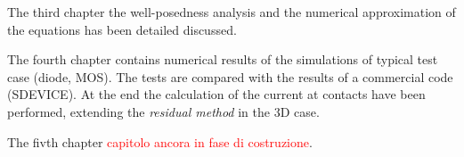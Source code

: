 The third chapter the well-posedness analysis and the numerical approximation of the equations has been detailed discussed.

The fourth chapter contains numerical results of the simulations of typical test case (diode, MOS). The tests are compared with the results of a commercial code (SDEVICE). At the end the calculation of the current at contacts have been performed, extending the \textit{residual method} \cite{ContactCurrentRM} in the 3D case.

The fivth chapter \textcolor{red}{capitolo ancora in fase di costruzione}.

